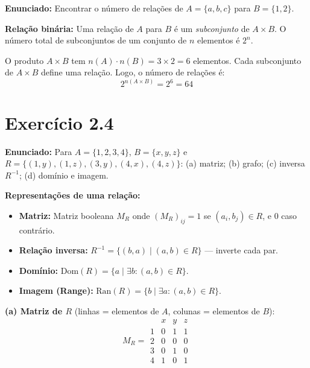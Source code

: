 \documentclass[12pt,a4paper]{article}
\begin{document}
\textbf{Enunciado:} Encontrar o número de relações de $A = \{a,b,c\}$ para $B = \{1,2\}$.

\begin{teoribox}
\textbf{Relação binária:} Uma relação de $A$ para $B$ é um \emph{subconjunto} de $A \times B$. O número total de subconjuntos de um conjunto de $n$ elementos é $2^n$.
\end{teoribox}

O produto $A \times B$ tem $n(A) \cdot n(B) = 3 \times 2 = 6$ elementos. Cada subconjunto de $A \times B$ define uma relação. Logo, o número de relações é:
\[
2^{n(A \times B)} = 2^6 = 64
\]

\section*{Exercício 2.4}

\textbf{Enunciado:} Para $A=\{1,2,3,4\}$, $B=\{x,y,z\}$ e $R = \{(1,y),(1,z),(3,y),(4,x),(4,z)\}$: (a) matriz; (b) grafo; (c) inversa $R^{-1}$; (d) domínio e imagem.

\begin{teoribox}
\textbf{Representações de uma relação:}
\begin{itemize}
  \item \textbf{Matriz:} Matriz booleana $M_R$ onde $(M_R)_{ij} = 1$ se $(a_i, b_j) \in R$, e $0$ caso contrário.
  \item \textbf{Relação inversa:} $R^{-1} = \{(b,a) \mid (a,b) \in R\}$ --- inverte cada par.
  \item \textbf{Domínio:} $\text{Dom}(R) = \{a \mid \exists b: (a,b) \in R\}$.
  \item \textbf{Imagem (Range):} $\text{Ran}(R) = \{b \mid \exists a: (a,b) \in R\}$.
\end{itemize}
\end{teoribox}

\textbf{(a) Matriz de $R$} (linhas = elementos de $A$, colunas = elementos de $B$):
\[
M_R = \begin{array}{c|ccc}
 & x & y & z \\ \hline
1 & 0 & 1 & 1 \\
2 & 0 & 0 & 0 \\
3 & 0 & 1 & 0 \\
4 & 1 & 0 & 1
\end{array}
\]
\end{document}
